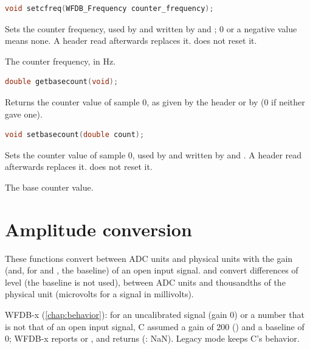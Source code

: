 \begin{lstlisting}[language=C,style=signature]
void setcfreq(WFDB_Frequency counter_frequency);
\end{lstlisting}
Sets the counter frequency, used by  and written by
 and ; 0 or a negative value means none. A
header read afterwards replaces it.  does not reset it.
\begin{params}
\item[counter\_frequency] The counter frequency, in Hz.
\end{params}

\begin{lstlisting}[language=C,style=signature]
double getbasecount(void);
\end{lstlisting}
Returns the counter value of sample 0, as given by the header or by
 (0 if neither gave one).

\begin{lstlisting}[language=C,style=signature]
void setbasecount(double count);
\end{lstlisting}
Sets the counter value of sample 0, used by  and written by
 and . A header read afterwards replaces it.
 does not reset it.
\begin{params}
\item[count] The base counter value.
\end{params}

\section{Amplitude conversion}
\label{sec:library-amplitude}

These functions convert between ADC units and physical units with the gain
(and, for  and , the baseline) of an open input
signal.  and  convert differences of level (the
baseline is not used), between ADC units and thousandths of the physical
unit (microvolts for a signal in millivolts).

WFDB-x (\cref{chap:behavior}): for an uncalibrated signal (gain 0) or a
number that is not that of an open input signal, C assumed a gain of 200
() and a baseline of 0; WFDB-x reports  or , and
returns  (: NaN). Legacy mode keeps
C's behavior.

